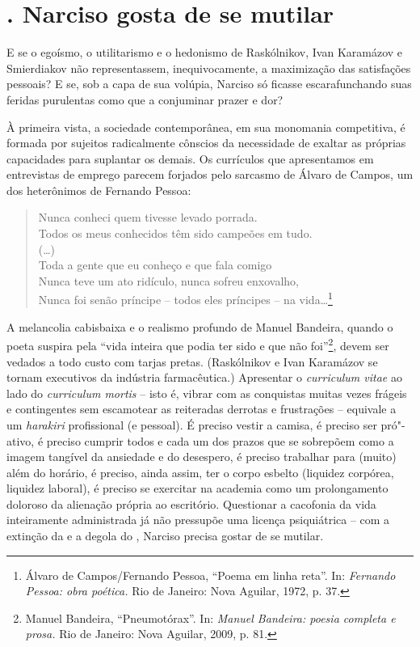 \section{. Narciso gosta de se mutilar}

E se o egoísmo, o utilitarismo e o hedonismo de Raskólnikov, Ivan
Karamázov e Smierdiakov não representassem, inequivocamente, a
maximização das satisfações pessoais? E se, sob a capa de sua volúpia,
Narciso só ficasse escarafunchando suas feridas purulentas como que a
conjuminar prazer e dor?

À primeira vista, a sociedade contemporânea, em sua monomania
competitiva, é formada por sujeitos radicalmente cônscios da necessidade
de exaltar as próprias capacidades para suplantar os demais. Os
currículos que apresentamos em entrevistas de emprego parecem forjados
pelo sarcasmo de Álvaro de Campos, um dos heterônimos de Fernando
Pessoa:

\begin{verse}
Nunca conheci quem tivesse levado porrada.\\
Todos os meus conhecidos têm sido campeões \qb{}em tudo.\\
(\ldots{})\\[5pt]
Toda a gente que eu conheço e que fala comigo\\
Nunca teve um ato ridículo, nunca sofreu enxovalho,\\
Nunca foi senão príncipe -- todos eles príncipes -- \qb{}na vida\ldots{}\footnote{Álvaro
  de Campos/Fernando Pessoa, ``Poema em linha reta''. In: \emph{Fernando
  Pessoa: obra poética.} Rio de Janeiro: Nova Aguilar, 1972, p. 37.}
\end{verse}

A melancolia cabisbaixa e o realismo profundo de Manuel Bandeira, quando
o poeta suspira pela ``vida inteira que podia ter sido e que não
foi''\footnote{Manuel Bandeira, ``Pneumotórax''. In: \emph{Manuel
  Bandeira: poesia completa e prosa.} Rio de Janeiro: Nova Aguilar,
  2009, p. 81.}, devem ser vedados a todo custo com tarjas pretas.
(Raskólnikov e Ivan Karamázov se tornam executivos da indústria
farmacêutica.) Apresentar o \emph{curriculum vitae} ao lado do
\emph{curriculum mortis} -- isto é, vibrar com as conquistas muitas
vezes frágeis e contingentes sem escamotear as reiteradas derrotas e
frustrações -- equivale a um \emph{harakiri} profissional (e pessoal). É
preciso vestir a camisa, é preciso ser pró"-ativo, é preciso cumprir
todos e cada um dos prazos que se sobrepõem como a imagem tangível da
ansiedade e do desespero, é preciso trabalhar para (muito) além do
horário, é preciso, ainda assim, ter o corpo esbelto (liquidez corpórea,
liquidez laboral), é preciso se exercitar na academia como um
prolongamento doloroso da alienação própria ao escritório. Questionar a
cacofonia da vida inteiramente administrada já não pressupõe uma licença
psiquiátrica -- com a extinção da  e a degola do , Narciso
precisa gostar de se mutilar.

